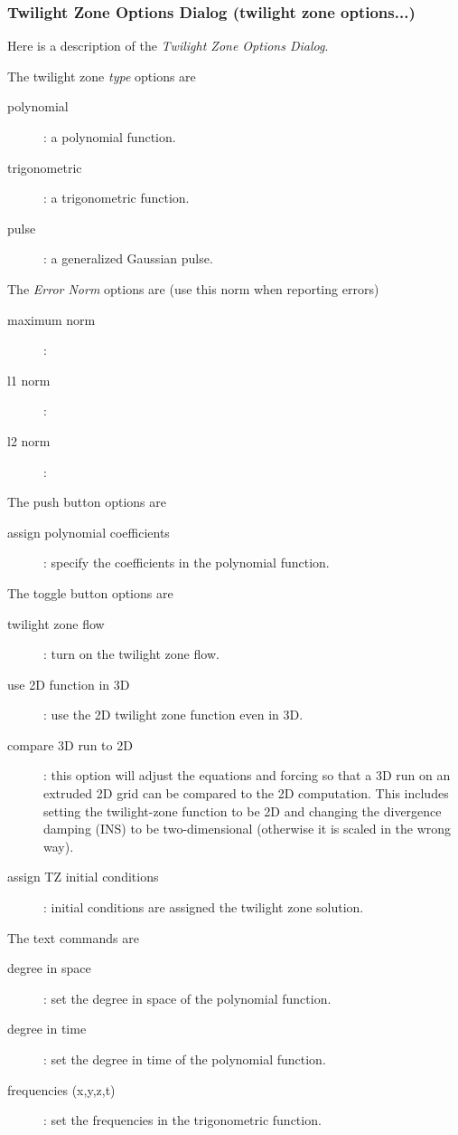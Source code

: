 \subsubsection{Twilight Zone Options Dialog (twilight zone options...)}\label{sec:twilightZoneOptions}

Here is a description of the {\em Twilight Zone Options Dialog}.

\noindent The twilight zone {\em type} options are
\begin{description}
  \item[\qquad polynomial] : a polynomial function.
  \item[\qquad trigonometric] : a trigonometric function.
  \item[\qquad pulse] : a generalized Gaussian pulse.
\end{description}

\noindent The {\em Error Norm} options are (use this norm when reporting errors)
\begin{description}
  \item[\qquad maximum norm] : 
  \item[\qquad l1 norm] : 
  \item[\qquad l2 norm] : 
\end{description}

\noindent The push button options are
\begin{description}
  \item[\qquad assign polynomial coefficients] : specify the coefficients in the polynomial function.
\end{description}

\noindent The toggle button options are
\begin{description}
  \item[\qquad twilight zone flow] : turn on the twilight zone flow.
  \item[\qquad use 2D function in 3D] : use the 2D twilight zone function even in 3D. 
  \item[\qquad compare 3D run to 2D] : this option will adjust the equations and forcing so
         that a 3D run on an extruded 2D grid can be compared to the 2D computation. This includes setting
         the twilight-zone function to be 2D and changing the divergence damping (INS) to be two-dimensional 
         (otherwise it is scaled in the wrong way).
  \item[\qquad assign TZ initial conditions] : initial conditions are assigned the twilight zone solution.
\end{description}

\noindent The text commands are
\begin{description}
  \item[\qquad degree in space ] : set the degree in space of the polynomial function.
  \item[\qquad degree in time ] : set the degree in time of the polynomial function.
  \item[\qquad frequencies (x,y,z,t)] : set the frequencies in the trigonometric function.
\end{description}
